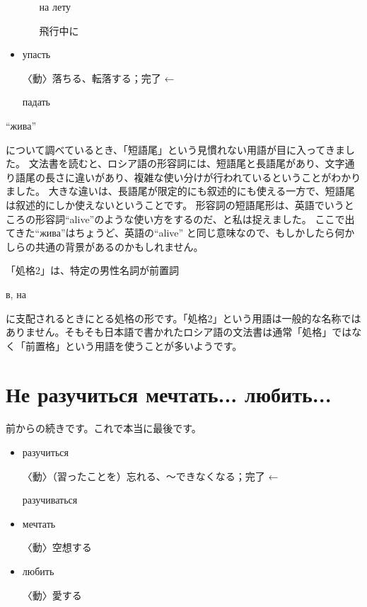 \documentclass[12pt]{ltjsarticle}
\begin{document}
\begin{itemize}
        \begin{itemize}
            \begin{russian}на лету\end{russian} 飛行中に
        \end{itemize}
    \item \begin{russian}упасть\end{russian}  〈動〉落ちる、転落する；完了 ← \begin{russian}падать\end{russian} 
\end{itemize}

\bigskip

\begin{russian}``жива''\end{russian}について調べているとき、「短語尾」という見慣れない用語が目に入ってきました。
文法書を読むと、ロシア語の形容詞には、短語尾と長語尾があり、文字通り語尾の長さに違いがあり、複雑な使い分けが行われているということがわかりました。
大きな違いは、長語尾が限定的にも叙述的にも使える一方で、短語尾は叙述的にしか使えないということです。
形容詞の短語尾形は、英語でいうところの形容詞``alive''のような使い方をするのだ、と私は捉えました。
ここで出てきた``жива''はちょうど、英語の``alive'' と同じ意味なので、もしかしたら何かしらの共通の背景があるのかもしれません。

「処格2」は、特定の男性名詞が前置詞\begin{russian}в, на\end{russian}に支配されるときにとる処格の形です。「処格2」という用語は一般的な名称ではありません。そもそも日本語で書かれたロシア語の文法書は通常「処格」ではなく「前置格」という用語を使うことが多いようです。

\section{Не разучиться мечтать... любить...}

前からの続きです。これで本当に最後です。
\begin{itemize}
    \item \begin{russian}разучиться\end{russian}  〈動〉（習ったことを）忘れる、〜できなくなる；完了 ← \begin{russian}разучиваться\end{russian} 
    \item \begin{russian}мечтать\end{russian}  〈動〉空想する
    \item \begin{russian}любить\end{russian}  〈動〉愛する
\end{itemize}
\end{document}
